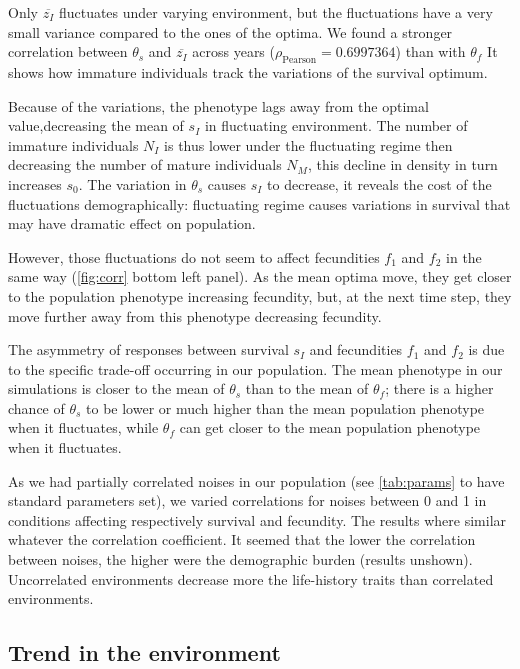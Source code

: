 Only $\overline{z_I}$ fluctuates under varying environment, but the fluctuations have a very small variance compared to the ones of the optima. We found a stronger correlation between $\theta_s$ and $\overline{z_I}$ across years ($\rho_{\text{Pearson}} = 0.6997364$) than with $\theta_f$ It shows how immature individuals track the variations of the survival optimum.

Because of the variations, the phenotype lags away from the optimal value,decreasing the mean of $s_I$ in fluctuating environment. The number of immature individuals $N_I$ is thus lower under the fluctuating regime then decreasing the number of mature individuals $N_M$, this decline in density in turn increases $s_0$. The variation in $\theta_s$ causes $s_I$ to decrease, it reveals the cost of the fluctuations demographically: fluctuating regime causes variations in survival that may have dramatic effect on population.

However, those fluctuations do not seem to affect fecundities $f_1$ and $f_2$ in the same way (\autoref{fig:corr} bottom left panel). As the mean optima move, they get closer to the population phenotype increasing fecundity, but, at the next time step, they move further away from this phenotype decreasing fecundity.

The asymmetry of responses between survival $s_I$ and fecundities $f_1$ and $f_2$ is due to the specific trade-off occurring in our population. The mean phenotype in our simulations is closer to the mean of $\theta_s$ than to the mean of $\theta_f$; there is a higher chance of $\theta_s$ to be lower or much higher than the mean population phenotype when it fluctuates, while $\theta_f$ can get closer to the mean population phenotype when it fluctuates.

As we had partially correlated noises in our population (see \autoref{tab:params} to have standard parameters set), we varied correlations for noises between 0 and 1 in conditions affecting respectively survival and fecundity. The results where similar whatever the correlation coefficient. It seemed that the lower the correlation between noises, the higher were the demographic burden (results unshown). Uncorrelated environments decrease more the life-history traits than correlated environments.

\subsection*{Trend in the environment}

